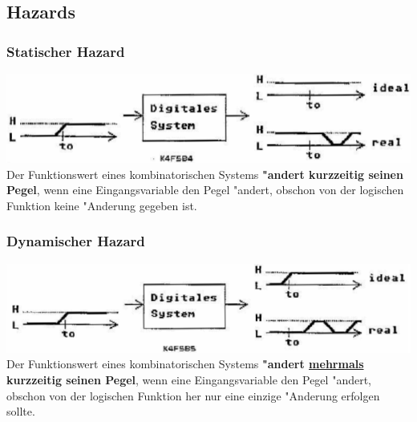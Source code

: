 \subsection{Hazards}
	\begin{minipage}[c]{9 cm}
		\subsubsection{Statischer Hazard}
			\includegraphics[width=1\textwidth]{pics/hazardstatisch}
			Der Funktionswert eines kombinatorischen Systems \textbf{"andert kurzzeitig seinen Pegel}, wenn eine Eingangsvariable den Pegel "andert, obschon von der logischen Funktion keine "Anderung gegeben ist.
	\end{minipage}
	\begin{minipage}[c]{9 cm}	
		\subsubsection{Dynamischer Hazard}
			\includegraphics[width=1\textwidth]{pics/hazarddynamisch}
			Der Funktionswert eines kombinatorischen Systems \textbf{"andert \underline{mehrmals} kurzzeitig seinen Pegel}, wenn eine Eingangsvariable den Pegel "andert, obschon von der logischen Funktion her nur eine einzige "Anderung erfolgen sollte.
	\end{minipage}
	
